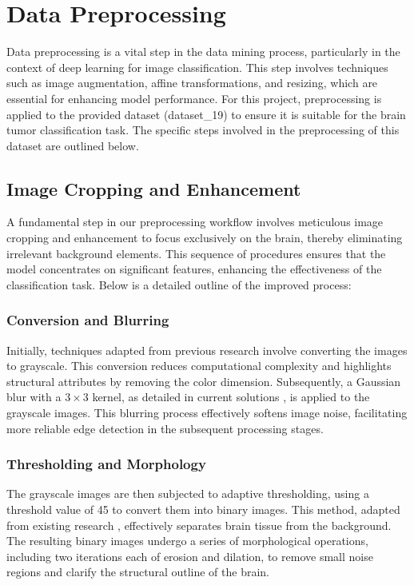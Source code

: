 \section{Data Preprocessing}\label{data_preprocessing}

Data preprocessing is a vital step in the data mining process, particularly in the context of deep learning for image classification. This step involves techniques such as image augmentation, affine transformations, and resizing, which are essential for enhancing model performance. For this project, preprocessing is applied to the provided dataset (dataset\_19) to ensure it is suitable for the brain tumor classification task. The specific steps involved in the preprocessing of this dataset are outlined below.

\subsection{Image Cropping and Enhancement}\label{image_cropping_enhancement}

A fundamental step in our preprocessing workflow involves meticulous image cropping and enhancement to focus exclusively on the brain, thereby eliminating irrelevant background elements. This sequence of procedures ensures that the model concentrates on significant features, enhancing the effectiveness of the classification task. Below is a detailed outline of the improved process:

\subsubsection{Conversion and Blurring}

Initially, techniques adapted from previous research \cite{healthcare10091801} involve converting the images to grayscale. This conversion reduces computational complexity and highlights structural attributes by removing the color dimension. Subsequently, a Gaussian blur with a $3 \times 3$ kernel, as detailed in current solutions \cite{brainsci13091320}, is applied to the grayscale images. This blurring process effectively softens image noise, facilitating more reliable edge detection in the subsequent processing stages.

\subsubsection{Thresholding and Morphology}

The grayscale images are then subjected to adaptive thresholding, using a threshold value of 45 to convert them into binary images. This method, adapted from existing research \cite{Vimala_Srinivasan_Mathivanan_Mahalakshmi_Jayagopal_Dalu_2023}, effectively separates brain tissue from the background. The resulting binary images undergo a series of morphological operations, including two iterations each of erosion and dilation, to remove small noise regions and clarify the structural outline of the brain.

